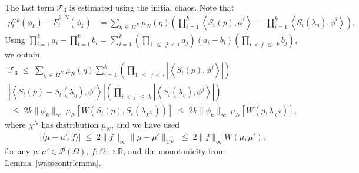 \documentclass[10pt,a4paper]{article}
\renewcommand{\leq}{\;\leqslant\;}
\newcommand{\Om}{\Omega}
\newcommand{\scalar}[2]{\langle #1, #2\rangle}
\newcommand{\tv}{\mathrm{TV}}
\newcommand{\cP}{\mathcal{P}}
\newcommand{\cT}{\mathcal{T}}
\newcommand{\bbR}{\mathbb{R}}
\let\O=\Omega
\begin{document}
The last term $\cT_3$ is estimated using the initial chaos. Note that
\begin{align}
p_t^{\otimes k}\left(\phi_k\right)-\bar{F}_t^{k,N}\left(\phi_k\right) & =\sum_{\eta\, \in\,\Om^N}\mu_N(\eta)\left(\prod_{i=1}^k\left\langle S_t(p),\phi^i\right\rangle
\,-\,\prod_{i=1}^k\left\langle S_t(\lambda_{\eta}),\phi^i\right\rangle\right).
\end{align}
Using $\prod_{i=1}^ka_i -\prod_{i=1}^kb_i = \sum_{i=1}^k(\prod_{1\,\leq\,j\,<\,i}a_j)(a_i-b_i)(\prod_{i\,<\,j\,\leq\,k}b_j)$, we obtain
\begin{multline*}
\cT_3
\leq\sum_{\eta\,\in\,\Om^N}\mu_N(\eta)\sum_{i=1}^k\left(\prod_{1\,\leq\,j\,<\,i}\left|\left\langle S_t(p),\phi^j\right\rangle\right|\right)\\
\left|\left\langle S_t(p)-S_t(\lambda_{\eta}),\phi^i\right\rangle\right|
\left(\prod_{i\,<\,j\,\leq\,k}\left|\left\langle S_t(\lambda_{\eta}),\phi^j\right\rangle\right|\right) \\
\leq 2k\|\phi_k\|_{\infty}\,\mu_N \left[W\left(S_t(p),S_t(\lambda_{\chi^N})\right)\right]\leq 2k\|\phi_k\|_{\infty}\,\mu_N \left[W\left(p,\lambda_{\chi^N}\right)\right],
\end{multline*}
where $\chi^N$ has distribution $\mu_N$, and we have used
\begin{align}\label{eq:sta}
|\scalar{\mu-\mu'}{f}|\leq 2\|f\|_\infty \|\mu-\mu'\|_\tv\leq 2\|f\|_\infty W(\mu,\mu'),
\end{align}
for any $\mu,\mu'\in\cP(\O)$, $f:\O\mapsto\bbR$, and the monotonicity from Lemma~\ref{wasscontrlemma}.
\end{document}
